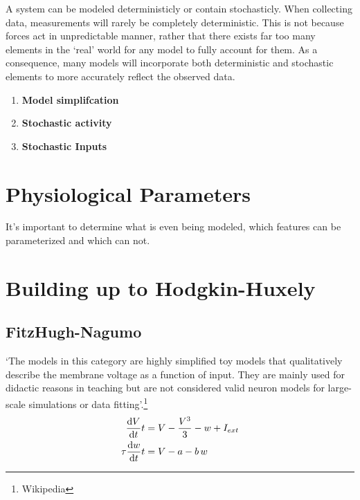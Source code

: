 \documentclass[../../Orator.tex]{subfiles}
\begin{document}
A system can be modeled deterministicly or contain stochasticly. When collecting data, measurements will rarely be completely deterministic. This is not because forces act in unpredictable manner, rather that there exists far too many elements in the `real' world for any model to fully account for them. 
As a consequence, many models will incorporate both deterministic and stochastic elements to more accurately reflect the observed data.
\begin{enumerate}
    \item \textbf{Model simplifcation}
    \item \textbf{Stochastic activity}
    \item \textbf{Stochastic Inputs}
\end{enumerate}



\newpage
\section{Physiological Parameters}
It's important to determine what is even being modeled, which features can be parameterized and which can not.


\newpage
\section{Building up to Hodgkin-Huxely}

\subsection{FitzHugh-Nagumo}
`The models in this category are highly simplified toy models that qualitatively describe the membrane voltage as a function of input. They are mainly used for didactic reasons in teaching but are not considered valid neuron models for large-scale simulations or data fitting'.\footnote{Wikipedia}
\begin{subequations}\label{eq:FitNagSys}
    \begin{align}
        \ode{V}{t} &= V - \frac{V^3}{3} - w + I_{ext} \\ 
        \tau\ode{w}{t} &= V - a - b\,w 
    \end{align}
\end{subequations}
\end{document}
